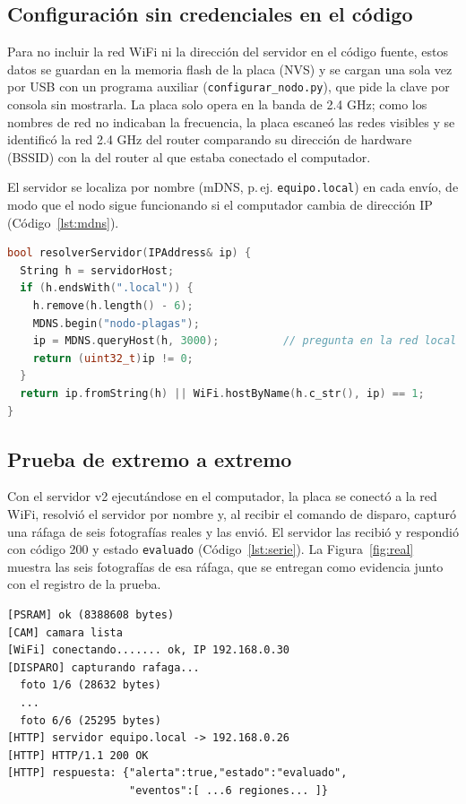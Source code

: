\documentclass[11pt,a4paper]{article}
\begin{document}
\subsection{Configuración sin credenciales en el código}

Para no incluir la red WiFi ni la dirección del servidor en el código fuente, estos datos se guardan en la memoria flash de la placa (NVS) y se cargan una sola vez por USB con un programa auxiliar (\texttt{configurar\_nodo.py}), que pide la clave por consola sin mostrarla. La placa solo opera en la banda de 2.4 GHz; como los nombres de red no indicaban la frecuencia, la placa escaneó las redes visibles y se identificó la red 2.4 GHz del router comparando su dirección de hardware (BSSID) con la del router al que estaba conectado el computador.

El servidor se localiza por nombre (mDNS, p.\,ej. \texttt{equipo.local}) en cada envío, de modo que el nodo sigue funcionando si el computador cambia de dirección IP (Código~\ref{lst:mdns}).

\begin{lstlisting}[language=C++,caption={Resolución del servidor por nombre en cada envío (fragmento).},label={lst:mdns}]
bool resolverServidor(IPAddress& ip) {
  String h = servidorHost;
  if (h.endsWith(".local")) {
    h.remove(h.length() - 6);
    MDNS.begin("nodo-plagas");
    ip = MDNS.queryHost(h, 3000);          // pregunta en la red local
    return (uint32_t)ip != 0;
  }
  return ip.fromString(h) || WiFi.hostByName(h.c_str(), ip) == 1;
}
\end{lstlisting}

\subsection{Prueba de extremo a extremo}

Con el servidor v2 ejecutándose en el computador, la placa se conectó a la red WiFi, resolvió el servidor por nombre y, al recibir el comando de disparo, capturó una ráfaga de seis fotografías reales y las envió. El servidor las recibió y respondió con código 200 y estado \texttt{evaluado} (Código~\ref{lst:serie}). La Figura~\ref{fig:real} muestra las seis fotografías de esa ráfaga, que se entregan como evidencia junto con el registro de la prueba.

\begin{lstlisting}[caption={Salida serie de la placa durante el disparo (prueba real).},label={lst:serie}]
[PSRAM] ok (8388608 bytes)
[CAM] camara lista
[WiFi] conectando....... ok, IP 192.168.0.30
[DISPARO] capturando rafaga...
  foto 1/6 (28632 bytes)
  ...
  foto 6/6 (25295 bytes)
[HTTP] servidor equipo.local -> 192.168.0.26
[HTTP] HTTP/1.1 200 OK
[HTTP] respuesta: {"alerta":true,"estado":"evaluado",
                   "eventos":[ ...6 regiones... ]}
\end{lstlisting}
\end{document}
